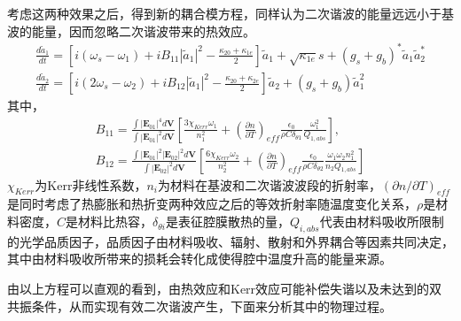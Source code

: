 考虑这两种效果之后，得到新的耦合模方程，同样认为二次谐波的能量远远小于基波的能量，因而忽略二次谐波带来的热效应。
\begin{gather}
\label{eq:cpmodec}
\frac{d\tilde{a}_1}{dt} = [i(\omega_s-\omega_1)+iB_{11}|\tilde{a}_1|^2-\frac{\kappa_{20}+\kappa_{1e}}{2}]\tilde{a}_1+\sqrt{\kappa_{1e}}s+(g_s+g_b)^*\tilde{a}_1\tilde{a}_2^* \\
\frac{d\tilde{a}_2}{dt} = [i(2\omega_s-\omega_2)+iB_{12}|\tilde{a}_1|^2-\frac{\kappa_{20}+\kappa_{2e}}{2}]\tilde{a}_2+(g_s+g_b)\tilde{a}_1^2
\label{eq:cpmodec2}
\end{gather}
其中，
\begin{gather}
B_{11} = \frac{\int|\mathbf{E}_{01}|^4d\mathbf{V}}{\int|\mathbf{E}_{01}|^2d\mathbf{V}}[\frac{3\chi_{Kerr}\omega_1}{n_1^2}+(\frac{\partial n}{\partial T})_{eff}\frac{\epsilon_0}{\rho C \delta_{\theta 1}}\frac{\omega_1^2}{Q_{1,abs}}], \\
B_{12} = \frac{\int|\mathbf{E}_{01}|^2|\mathbf{E}_{02}|^2d\mathbf{V}}{\int|\mathbf{E}_{02}|^2d\mathbf{V}}[\frac{6\chi_{Kerr}\omega_2}{n_2^2}+(\frac{\partial n}{\partial T})_{eff}\frac{\epsilon_0}{\rho C \delta_{\theta 2}}\frac{\omega_1\omega_2n_1^2}{n_2Q_{1,abs}}]
\end{gather}
$\chi_{Kerr}$为Kerr非线性系数，$n_i$为材料在基波和二次谐波波段的折射率，$(\partial n/\partial T)_{eff}$是同时考虑了热膨胀和热折变两种效应之后的等效折射率随温度变化关系，$\rho$是材料密度，$C$是材料比热容，$\delta_{\theta i}$是表征腔膜散热的量\cite{fomin2005nonstationary}，$Q_{i,abs}$代表由材料吸收所限制的光学品质因子\cite{rokhsari2004loss}，品质因子由材料吸收、辐射、散射和外界耦合等因素共同决定，其中由材料吸收所带来的损耗会转化成使得腔中温度升高的能量来源。

由以上方程可以直观的看到，由热效应和Kerr效应可能补偿失谐以及未达到的双共振条件，从而实现有效二次谐波产生，下面来分析其中的物理过程。

